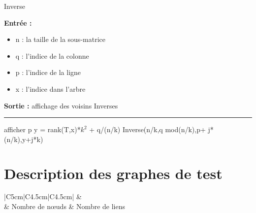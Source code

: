 \documentclass[a4paper,oneside,12pt]{report}
\theoremstyle{definition}
\begin{document}
\begin{appendix}
\begin{multicols}{2}
 
\columnbreak
 
\begin{algorithm}[H]
					\label{alg:Inverse}
					\caption{Inverse}
					\textbf{Entrée :}
						\begin{itemize}[label=$\bullet$]
							\item n : la taille de la sous-matrice
							\item q : l'indice de la colonne
							\item p : l'indice de la ligne 
							\item x : l'indice dans l'arbre
						\end{itemize}
					\textbf{Sortie :} affichage des voisins Inverses\\							\noindent\rule{\textwidth}{1pt}
						
						
				\begin{algorithmic} [1]
							\STATE afficher p
						\ENDIF
					\ELSE
							\STATE y = rank(T,x)*$k^2$ + q/(n/k)
								\STATE Inverse(n/k,q mod(n/k),p+ j*(n/k),y+j*k)
							\ENDFOR
						\ENDIF
					\ENDIF 
					
					
				\end{algorithmic}
			\end{algorithm}
			
\end{multicols}

\chapter{Description des graphes de test}
 \label{tableau des graphes de test}
 \begin{table}[H]
 \begin{tabular}{|C{5cm}|C{4.5cm}|C{4.5cm}|}
		\hline
		 &   \\ 
				&  Nombre de nœuds & Nombre de liens  \\ \hline	 \hline	
 

\end{tabular}
\end{table}
\end{appendix}
\end{document}
